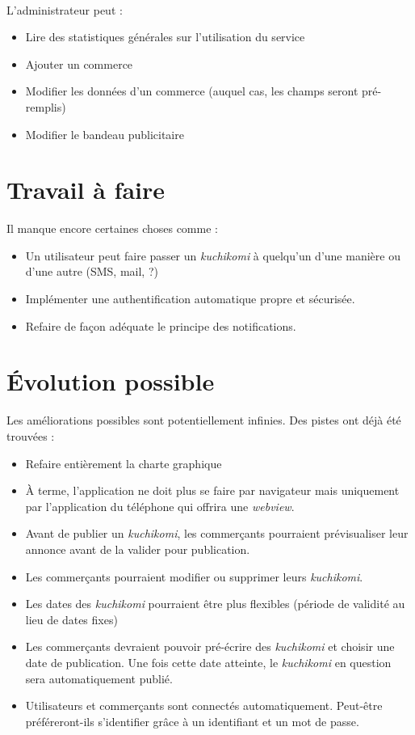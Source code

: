 \documentclass[a4paper,12pt,titlepage]{report}
\begin{document}
\paragraph*{}
L'administrateur peut :

\begin{itemize}
\item Lire des statistiques générales sur l'utilisation du service
\item Ajouter un commerce
\item Modifier les données d'un commerce (auquel cas, les champs seront pré-remplis)
\item Modifier le bandeau publicitaire
\end{itemize}


\section{Travail à faire}

Il manque encore certaines choses comme :
\begin{itemize}
\item Un utilisateur peut \og faire passer \fg{}  un \emph{kuchikomi} à quelqu'un d'une manière ou d'une autre (SMS, mail, ?)
\item Implémenter une authentification automatique propre et sécurisée.
\item Refaire de façon adéquate le principe des notifications.
\end{itemize}

\section{Évolution possible}

Les améliorations possibles sont potentiellement infinies. Des pistes ont déjà été trouvées :

\begin{itemize}
\item Refaire entièrement la charte graphique
\item À terme, l'application ne doit plus se faire par navigateur mais uniquement par l'application du téléphone qui offrira une \emph{webview}.
\item Avant de publier un \emph{kuchikomi}, les commerçants pourraient prévisualiser leur annonce avant de la valider pour publication.
\item Les commerçants pourraient modifier ou supprimer leurs \emph{kuchikomi}.
\item Les dates des \emph{kuchikomi} pourraient être plus flexibles (période de validité au lieu de dates fixes)
\item Les commerçants devraient pouvoir pré-écrire des \emph{kuchikomi} et choisir une date de publication. Une fois cette date atteinte, le \emph{kuchikomi} en question sera automatiquement publié.
\item Utilisateurs et commerçants sont connectés automatiquement. Peut-être préféreront-ils s'identifier grâce à un identifiant et un mot de passe.
\end{itemize}
\end{document}
